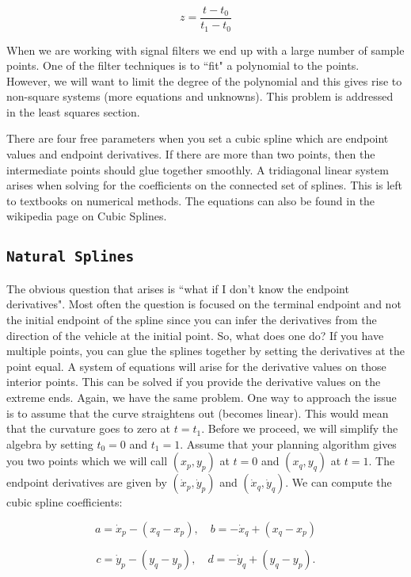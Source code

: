 \[z = \displaystyle \frac{t - t_0}{t_1-t_0}\]

When we are working with signal filters we end up with a large number of
sample points. One of the filter techniques is to ``fit" a polynomial to
the points. However, we will want to limit the degree of the polynomial
and this gives rise to non-square systems (more equations and unknowns).
This problem is addressed in the least squares section.

There are four free parameters when you set a cubic spline which are
endpoint values and endpoint derivatives. If there are more than two
points, then the intermediate points should glue together smoothly. A
tridiagonal linear system arises when solving for the coefficients on
the connected set of splines. This is left to textbooks on numerical
methods. The equations can also be found in the wikipedia page on Cubic
Splines.

\hypertarget{natural-splines}{%
\subsection{\texorpdfstring{\texttt{Natural\ Splines}}{Natural Splines}}\label{natural-splines}}

The obvious question that arises is ``what if I don't know the endpoint
derivatives". Most often the question is focused on the terminal
endpoint and not the initial endpoint of the spline since you can infer
the derivatives from the direction of the vehicle at the initial point.
So, what does one do? If you have multiple points, you can glue the
splines together by setting the derivatives at the point equal. A system
of equations will arise for the derivative values on those interior
points. This can be solved if you provide the derivative values on the
extreme ends. Again, we have the same problem. One way to approach the
issue is to assume that the curve straightens out (becomes linear). This
would mean that the curvature goes to zero at \(t=t_1\). Before we
proceed, we will simplify the algebra by setting \(t_0=0\) and
\(t_1=1\). Assume that your planning algorithm gives you two points
which we will call \((x_p,y_p)\) at \(t=0\) and \((x_q, y_q)\) at
\(t=1\). The endpoint derivatives are given by \((\dot{x}_p,\dot{y}_p)\)
and \((\dot{x}_q, \dot{y}_q)\). We can compute the cubic spline
coefficients:

\[a = \dot{x}_p-(x_q-x_p), \quad b = -\dot{x}_q+(x_q-x_p)\]

\[c = \dot{y}_p-(y_q-y_p), \quad d = -\dot{y}_q+(y_q-y_p).\]

